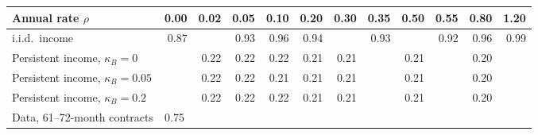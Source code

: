 \begin{tabular}{lrrrrrrrrrrr}
\toprule
Annual rate $\rho$ & 0.00 & 0.02 & 0.05 & 0.10 & 0.20 & 0.30 & 0.35 & 0.50 & 0.55 & 0.80 & 1.20 \\
\midrule
i.i.d.\ income & 0.87 &  & 0.93 & 0.96 & 0.94 &  & 0.93 &  & 0.92 & 0.96 & 0.99 \\
Persistent income, $\kappa_B = 0$ &  & 0.22 & 0.22 & 0.22 & 0.21 & 0.21 &  & 0.21 &  & 0.20 &  \\
Persistent income, $\kappa_B = 0.05$ &  & 0.22 & 0.22 & 0.21 & 0.21 & 0.21 &  & 0.21 &  & 0.20 &  \\
Persistent income, $\kappa_B = 0.2$ &  & 0.22 & 0.22 & 0.22 & 0.21 & 0.21 &  & 0.21 &  & 0.20 &  \\
\midrule
Data, 61--72-month contracts & \multicolumn{11}{l}{0.75} \\
\bottomrule
\end{tabular}
